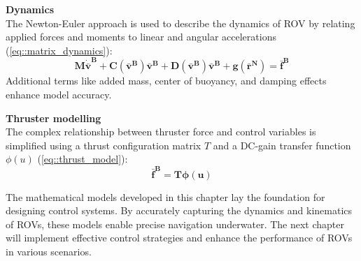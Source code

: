 \textbf{Dynamics} \\
The Newton-Euler approach is used to describe the dynamics of ROV by relating applied 
forces and moments to linear and angular accelerations (\ref{eq::matrix_dynamics}):
$$
\mathbf{M \dot{\bar{v}}^B + C(\bar{v}^B) \bar{v}^B+D(\bar{v}^B) 
\bar{v}^B+g(\bar{r}^N)= \bar{f}^B}
$$
Additional terms like added mass, center of buoyancy, and damping effects enhance model accuracy.

\textbf{Thruster modelling} \\
The complex relationship between thruster force and control variables 
is simplified using a thrust configuration matrix $T$ and a DC-gain transfer 
function $\phi(u)$ (\ref{eq::thrust_model}):
$$
\mathbf{\bar{f}^B=T\boldsymbol{\phi}(u)}
$$

The mathematical models developed in this chapter lay the foundation for designing control systems. 
By accurately capturing the dynamics and kinematics of ROVs, these models enable precise navigation 
underwater. The next chapter will implement effective control strategies and enhance the 
performance of ROVs in various scenarios.